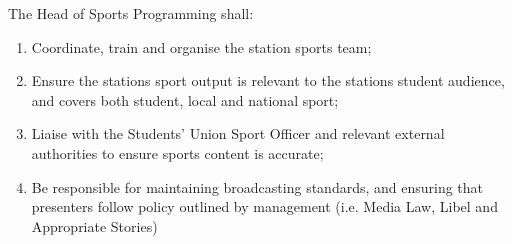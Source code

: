 \item The Head of Sports Programming shall:
\begin{enumerate}[label*=\arabic*.]
    \item Coordinate, train and organise the station sports team;
    \item Ensure the stations sport output is relevant to the stations student audience, and covers both student, local and national sport;
    \item Liaise with the Students' Union Sport Officer and relevant external authorities to ensure sports content is accurate;
    \item Be responsible for maintaining broadcasting standards, and ensuring that presenters follow policy outlined by management (i.e. Media Law, Libel and Appropriate Stories)
\end{enumerate}
